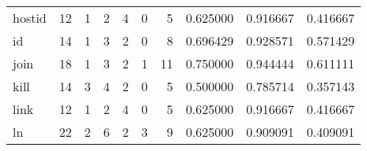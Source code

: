 \begin{tabular}{lrrrrrrrrr}
hostid    &                                      12 &                                                  1 &                                                  2 &                                                  4 &                                                  0 &                                                  5 &                                           0.625000 &                               0.916667 &                             0.416667 \\
id        &                                      14 &                                                  1 &                                                  3 &                                                  2 &                                                  0 &                                                  8 &                                           0.696429 &                               0.928571 &                             0.571429 \\
join      &                                      18 &                                                  1 &                                                  3 &                                                  2 &                                                  1 &                                                 11 &                                           0.750000 &                               0.944444 &                             0.611111 \\
kill      &                                      14 &                                                  3 &                                                  4 &                                                  2 &                                                  0 &                                                  5 &                                           0.500000 &                               0.785714 &                             0.357143 \\
link      &                                      12 &                                                  1 &                                                  2 &                                                  4 &                                                  0 &                                                  5 &                                           0.625000 &                               0.916667 &                             0.416667 \\
ln        &                                      22 &                                                  2 &                                                  6 &                                                  2 &                                                  3 &                                                  9 &                                           0.625000 &                               0.909091 &                             0.409091 \\

\end{tabular}

